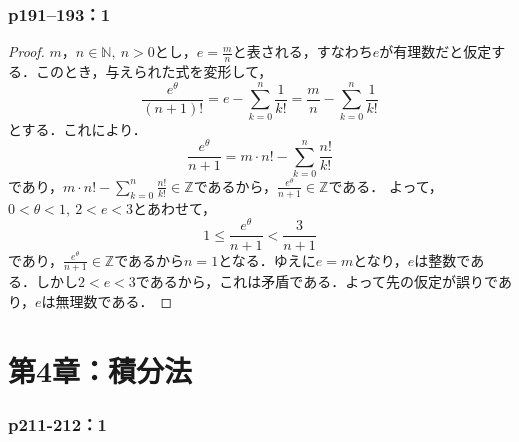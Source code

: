 \documentclass[a4paper,10pt,fleqn]{ltjsarticle}
\begin{document}
\section*{p191--193：1}


\begin{tleftbar}
    \begin{proof}
        $m，n \in \mathbb{N},~n >0$とし，$e=\frac{m}{n}$と表される，すなわち$e$が有理数だと仮定する．このとき，与えられた式を変形して，
        \[
            \frac{e^\theta}{(n+1)!} = e-\sum_{k=0}^{n} \frac{1}{k!} =\frac{m}{n}-\sum_{k=0}^{n} \frac{1}{k!}
        \]
        とする．これにより．
        \[
            \frac{e^{\theta}}{n+1} = m \cdot n! - \sum_{k=0}^{n} \frac{n!}{k!}
        \]
        であり，$m \cdot n! - \sum_{k=0}^{n} \frac{n!}{k!} \in \mathbb{Z}$であるから，$\frac{e^{\theta}}{n+1} \in \mathbb{Z}$である．
        よって，$0< \theta <1,~2<e<3$とあわせて，
        \[
            1 \le \frac{e^{\theta}}{n+1} < \frac{3}{n+1}
        \]
        であり，$\frac{e^{\theta}}{n+1} \in \mathbb{Z}$であるから$n=1$となる．ゆえに$e=m$となり，$e$は整数である．しかし$2<e<3$であるから，これは矛盾である．よって先の仮定が誤りであり，$e$は無理数である．
    \end{proof}
\end{tleftbar}
\newpage

\part*{第4章：積分法}



\section*{p211-212：1}
\end{document}
